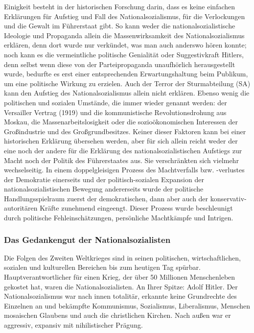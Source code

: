 \documentclass[letterpaper, 12pt]{article}
\let\tempsubsubsection\subsubsection
\renewcommand\subsubsection[1]{\vspace{0cm}\tempsubsubsection{#1}\vspace{0cm}}
\begin{document}
Einigkeit besteht in der historischen Forschung darin, dass es keine einfachen Erklärungen für Aufstieg und Fall des Nationalsozialismus, für die Verlockungen und die Gewalt im Führerstaat gibt. So kann weder die nationalsozialistische Ideologie und Propaganda allein die Massenwirksamkeit des Nationalsozialismus erklären, denn dort wurde nur verkündet, was man auch anderswo hören konnte; noch kann es die vermeintliche politische Genialität oder Suggestivkraft Hitlers, denn selbst wenn diese von der Parteipropaganda unaufhörlich herausgestellt wurde, bedurfte es erst einer entsprechenden Erwartungshaltung beim Publikum, um eine politische Wirkung zu erzielen. Auch der Terror der Sturmabteilung (SA) kann den Aufstieg des Nationalsozialismus allein nicht erklären. Ebenso wenig die politischen und sozialen Umstände, die immer wieder genannt werden: der Versailler Vertrag (1919) und die kommunistische Revolutionsdrohung aus Moskau, die Massenarbeitslosigkeit oder die sozioökonomischen Interessen der Großindustrie und des Großgrundbesitzes. Keiner dieser Faktoren kann bei einer historischen Erklärung übersehen werden, aber für sich allein reicht weder der eine noch der andere für die Erklärung des nationalsozialistischen Aufstiegs zur Macht noch der Politik des Führerstaates aus. Sie verschränkten sich vielmehr wechselseitig. In einem doppelgleisigen Prozess des Machtverfalls bzw. -verlustes der Demokratie einerseits und der politisch-sozialen Expansion der nationalsozialistischen Bewegung andererseits wurde der politische Handlungsspielraum zuerst der demokratischen, dann aber auch der konservativ-autoritären Kräfte zunehmend eingeengt. Dieser Prozess wurde beschleunigt durch politische Fehleinschätzungen, persönliche Machtkämpfe und Intrigen. 

\subsubsection{Das Gedankengut der Nationalsozialisten}

Die Folgen des Zweiten Weltkrieges sind in seinen politischen, wirtschaftlichen, sozialen und kulturellen Bereichen bis zum heutigen Tag spürbar. Hauptverantwortlicher für einen Krieg, der über 50 Millionen Menschenleben gekostet hat, waren die Nationalsozialisten. An Ihrer Spitze: Adolf Hitler. Der Nationalsozialismus war nach innen totalitär, erkannte keine Grundrechte des Einzelnen an und bekämpfte Kommunismus, Sozialismus, Liberalismus, Menschen mosaischen Glaubens und auch die christlichen Kirchen. Nach außen war er aggressiv, expansiv mit nihilistischer Prägung.
\end{document}
